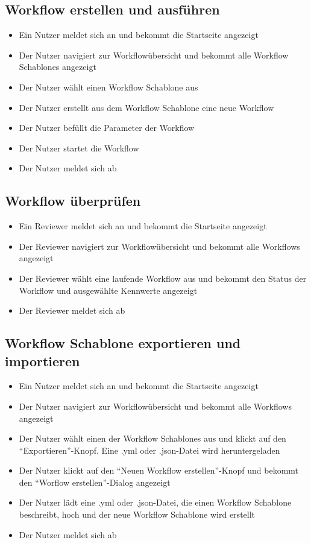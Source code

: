 \subsection*{\gls{Workflow} erstellen und ausführen}
\begin{itemize}
    \item Ein \Gls{Nutzer} meldet sich an und bekommt die Startseite angezeigt
    \item Der \Gls{Nutzer} navigiert zur Workflowübersicht und bekommt alle \glspl{Workflow Schablone} angezeigt
    \item Der \gls{Nutzer} wählt einen \gls{Workflow Schablone} aus
    \item Der \gls{Nutzer} erstellt aus dem \gls{Workflow Schablone} eine neue \gls{Workflow} 
    \item Der \gls{Nutzer} befüllt die Parameter der \gls{Workflow}
    \item Der \gls{Nutzer} startet die \gls{Workflow}
    \item Der \gls{Nutzer} meldet sich ab
\end{itemize}

\newpage
\subsection*{\gls{Workflow} überprüfen}
\begin{itemize}
    \item Ein \Gls{Reviewer} meldet sich an und bekommt die Startseite angezeigt
    \item Der \Gls{Reviewer} navigiert zur Workflowübersicht und bekommt alle \glspl{Workflow} angezeigt
    \item Der \Gls{Reviewer} wählt eine laufende \gls{Workflow} aus und bekommt den Status der \gls{Workflow} und ausgewählte Kennwerte angezeigt
    \item Der \gls{Reviewer} meldet sich ab
\end{itemize}

\subsection*{\gls{Workflow Schablone} exportieren und importieren}
\begin{itemize}
    \item Ein \gls{Nutzer} meldet sich an und bekommt die Startseite angezeigt
    \item Der \gls{Nutzer} navigiert zur Workflowübersicht und bekommt alle Workflows angezeigt
    \item Der \gls{Nutzer} wählt einen der \glspl{Workflow Schablone} aus und klickt auf den \enquote{Exportieren}-Knopf. Eine .yml oder .json-Datei wird heruntergeladen
    \item Der \gls{Nutzer} klickt auf den \enquote{Neuen Workflow erstellen}-Knopf und bekommt den \enquote{Worflow erstellen}-Dialog angezeigt
    \item Der \gls{Nutzer} lädt eine .yml oder .json-Datei, die einen \gls{Workflow Schablone} beschreibt, hoch und der neue \gls{Workflow Schablone} wird erstellt
    \item Der \gls{Nutzer} meldet sich ab
\end{itemize}
\newpage
